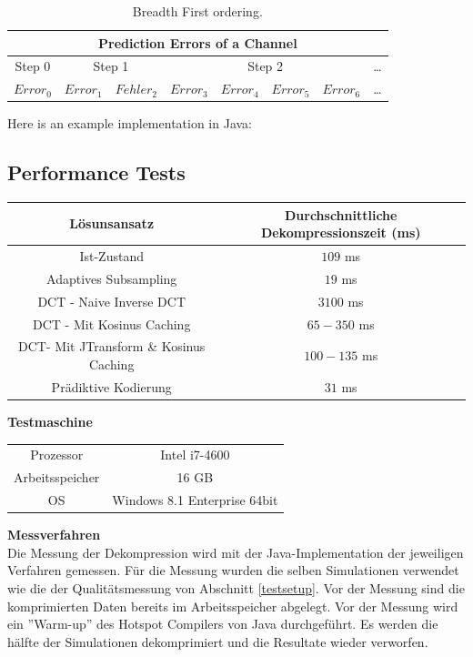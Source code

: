 \begin{table}[!htbp]
	\center
	\begin{tabular}{|c||c|c||c|c|c|c||c}
		\hline
		\multicolumn{8}{|c|}{Prediction Errors of a Channel}\\\hline\hline
		 Step 0& \multicolumn{2}{|c||}{Step 1} & \multicolumn{4}{|c||}{Step 2} &\ldots \\\hline
		$Error_0$ & $Error_1$ &$Fehler_2$ &$Error_3$ & $Error_4$ & $Error_5$ & $Error_6$   & \ldots \\\hline
	\end{tabular}
	\caption{Breadth First ordering.}
	\label{anhang:prediction:breath}
\end{table}
\pagebreak
Here is an example implementation in Java:

\pagebreak

\subsection{Performance Tests} \label{anhang:performance}
\begin{table}[!htbp]
\center
\begin{tabular}{c|c}
	Lösunsansatz & Durchschnittliche Dekompressionszeit (ms) \\\hline
	Ist-Zustand & $109$ ms\\
	Adaptives Subsampling & $19$ ms \\
	DCT - Naive Inverse DCT & $3100$ ms \\
	DCT - Mit Kosinus Caching & $65-350$ ms\\
	DCT- Mit JTransform \& Kosinus Caching & $100-135$ ms\\
	Prädiktive Kodierung & $31$ ms\\
\end{tabular}
\end{table}

\textbf{Testmaschine}
\begin{table}[!htbp]
\begin{tabular}{c|c}
	Prozessor & Intel i7-4600 \\
	Arbeitsspeicher & 16 GB \\
	OS & Windows 8.1 Enterprise 64bit \\
\end{tabular}
\end{table}

\textbf{Messverfahren}\\
Die Messung der Dekompression wird mit der Java-Implementation der jeweiligen Verfahren gemessen. Für die Messung wurden die selben Simulationen verwendet wie die der Qualitätsmessung von Abschnitt \ref{testsetup}. Vor der Messung sind die komprimierten Daten bereits im Arbeitsspeicher abgelegt. Vor der Messung wird ein ''Warm-up'' des Hotspot Compilers von Java durchgeführt. Es werden die hälfte der Simulationen dekomprimiert und die Resultate wieder verworfen.